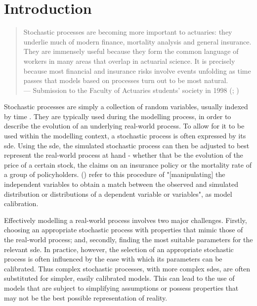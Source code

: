 \documentclass[11pt,oneside,openany,a4paper,english, report, goldenblock
]{usthesis}
\begin{document}
\section{Introduction}

\begin{quote}
	Stochastic processes are becoming more important to actuaries: they underlie much of modern finance, mortality analysis and general insurance. They are immensely useful because they form the common language of workers in many areas that overlap in actuarial science.  It is precisely because most financial and insurance risks involve events unfolding as time passes that models based on processes turn out to be most natural.
	\\ --- Submission to the Faculty of Actuaries students' society in 1998 (; \citeyear{cairns1998stochastic})
\end{quote}

Stochastic processes are simply a collection of random variables, usually indexed by time \citep{Barone-Adesi}. They are typically used during the modelling process, in order to describe the evolution of an underlying real-world process. To allow for it to be used within the modelling context, a stochastic process is often expressed by its \acrfull{sde}. 
Using the \acrshort{sde}, the simulated stochastic process can then be adjusted to best represent the real-world process at hand - whether that be the evolution of the price of a certain stock, the claims on an insurance policy or the mortality rate of a group of policyholders. 
 (\citeyear{Oreskes}) refer to this procedure of "[manipulating] the independent variables to obtain a match between the observed and simulated distribution or distributions of a dependent variable or variables", as model calibration.


Effectively modelling a real-world process involves two major challenges. Firstly, choosing an appropriate stochastic process with properties that mimic those of the real-world process; and, secondly, finding the most suitable parameters for the relevant \acrshort{sde}. In practice, however, the selection of an appropriate stochastic process is often influenced by the ease with which its parameters can be calibrated. Thus complex stochastic processes, with more complex \acrshort{sde}s, are often substituted for simpler, easily calibrated models. This can lead to the use of models that are subject to simplifying assumptions or possess properties that may not be the best possible representation of reality.
\end{document}
